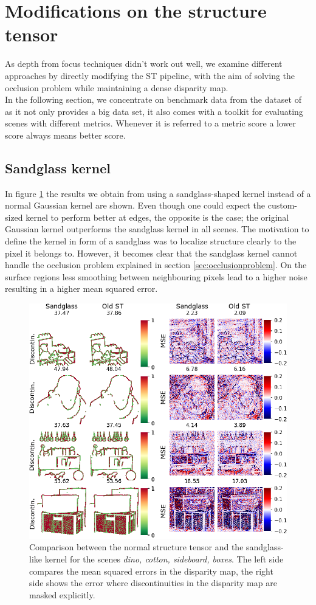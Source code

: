 \documentclass  [
  paper    = a4,
  BCOR     = 10mm,
  twoside,
  fontsize = 12pt,
  fleqn,
  toc      = bibnumbered,
  toc      = listofnumbered,
  numbers  = noendperiod,
  headings = normal,
  listof   = leveldown,
  version  = 3.03
]                                       {scrreprt}
\begin{document}
\section{Modifications on the structure tensor}
\label{sec:modifications}
As depth from focus techniques didn't work out well, we examine different approaches by directly modifying the ST pipeline, with the aim of solving the occlusion problem while maintaining a dense disparity map.\\
In the following section, we concentrate on benchmark data from the dataset of \cite{honauer2016benchmark} as it not only provides a big data set, it also comes with a toolkit for evaluating scenes with different metrics. Whenever it is referred to a metric score a lower score always means better score.
\subsection{Sandglass kernel}
In figure \ref{fig:sandclockresults} the results we obtain from using a sandglass-shaped kernel instead of a normal Gaussian kernel are shown. Even though one could expect the custom-sized kernel to perform better at edges, the opposite is the case; the original Gaussian kernel outperforms the sandglass kernel in all scenes. The motivation to define the kernel in form of a sandglass was to localize structure clearly to the pixel it belongs to. However, it becomes clear that the sandglass kernel cannot handle the occlusion problem explained in section \ref{sec:occlusionproblem}. On the surface regions less smoothing between neighbouring pixels lead to a higher noise resulting in a higher mean squared error. 
\begin{figure}[h!]
	\centering
	\includegraphics[width=0.7\linewidth]{images/sandclock_results}
	\caption[Results with custom sized kernel]{Comparison between the normal structure tensor and the sandglass- like kernel for the scenes \textit{dino, cotton, sideboard, boxes}. The left side compares the mean squared errors in the disparity map, the right side shows the error where discontinuities in the disparity map are masked explicitly.}
	\label{fig:sandclockresults}
\end{figure}
\end{document}
